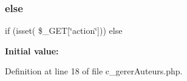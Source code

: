 \subsubsection{\texorpdfstring{else}{else}}
{\footnotesize\ttfamily if (isset( \$\+\_\+\+G\+ET\mbox{[}\char`\"{}action\char`\"{}\mbox{]})) else}

{\bfseries Initial value\+:}


Definition at line 18 of file c\+\_\+gerer\+Auteurs.\+php.

